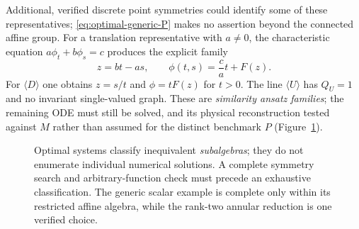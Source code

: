 \documentclass[12pt,a4paper,oneside]{report}
\numberwithin{equation}{chapter}
\theoremstyle{remark}\newtheorem{remark}[theorem]{Remark}
\begin{document}
Additional, verified discrete point symmetries could identify some of
these representatives; \eqref{eq:optimal-generic-P} makes no assertion
beyond the connected affine group. For a translation representative
with $a\ne0$, the characteristic equation $a\phi_t+b\phi_s=c$
produces the explicit family
\begin{equation}\label{eq:translation-profile}
 z=bt-as,\qquad \phi(t,s)=\frac ca t+F(z).
\end{equation}
For $\langle D\rangle$ one obtains $z=s/t$ and
$\phi=tF(z)$ for $t>0$. The line $\langle U\rangle$ has
$Q_U=1$ and no invariant single-valued graph. These are
\emph{similarity ansatz families}; the remaining ODE must still be
solved, and its physical reconstruction tested against $M$ rather than
assumed for the distinct benchmark $P$
(Figure~\ref{fig:optimal-system-map}).

\begin{figure}[htbp]\centering
{}
\caption[Optimal systems and inequivalent reductions]{Optimal systems classify inequivalent \emph{subalgebras}; they do
not enumerate individual numerical solutions. A complete symmetry search
and arbitrary-function check must precede an exhaustive classification.
The generic scalar example is complete only within its restricted affine
algebra, while the rank-two annular reduction is one verified choice.}
\label{fig:optimal-system-map}
\end{figure}
\end{document}
